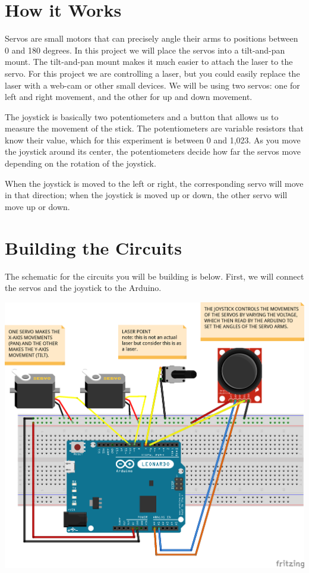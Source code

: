 \documentclass{article}
\begin{document}
\section{How it Works}
Servos are small motors that can precisely angle their arms to positions between 0 and 180
degrees. In this project we will place the servos into a tilt-and-pan mount. The tilt-and-pan mount
makes it much easier to attach the laser to the servo. For this project we are controlling a laser,
but you could easily replace the laser with a web-cam or other small devices. We will be using two
servos: one for left and right movement, and the other for up and down movement.

The joystick is basically two potentiometers and a button that allows us to measure the movement of
the stick. The potentiometers are variable resistors that know their value, which for this
experiment is between 0 and 1,023. As you move the joystick around its center, the potentiometers
decide how far the servos move depending on the rotation of the joystick.

When the joystick is moved to the left or right, the corresponding servo will move in that
direction; when the joystick is moved up or down, the other servo will move up or down.

\section{Building the Circuits}
The schematic for the circuits you will be building is below. First, we will connect the servos and
the joystick to the Arduino.

\begin{center}
\includegraphics[width=\textwidth]{diagram.png}
\end{center}
\end{document}
